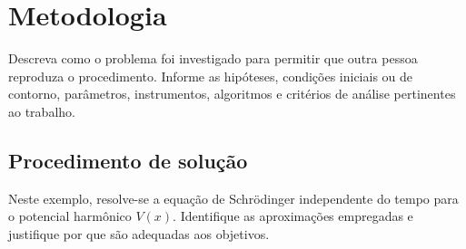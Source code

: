 \chapter{Metodologia}
\label{cap:metodologia}

Descreva como o problema foi investigado para permitir que outra pessoa
reproduza o procedimento. Informe as hipóteses, condições iniciais ou de
contorno, parâmetros, instrumentos, algoritmos e critérios de análise
pertinentes ao trabalho.

\section{Procedimento de solução}

Neste exemplo, resolve-se a equação de Schrödinger independente do tempo
para o potencial harmônico \(V(x)\). Identifique as aproximações empregadas
e justifique por que são adequadas aos objetivos.



